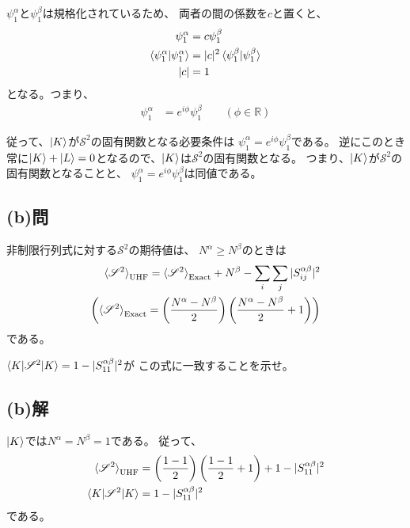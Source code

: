 $\psi_1^{\alpha}$と$\psi_1^{\beta}$は規格化されているため、
両者の間の係数を$c$と置くと、
\begin{align}
	\psi_1^{\alpha}
&=
	c\psi_1^{\beta} \\
%
%
	\braket{\psi_1^{\alpha}|\psi_1^{\alpha}}
&=
	|c|^2 \braket{\psi_1^{\beta}|\psi_1^{\beta}} \\
%
%
	|c|
&=
	1
\end{align}
となる。つまり、
\begin{align}
	\psi_1^{\alpha}
&=
	e^{i\phi} \psi_1^{\beta}
	\qquad
	(\phi\in\mathbb{R})
\end{align}

従って、$\ket{K}$が$\mathscr{S}^2$の固有関数となる必要条件は
$\psi_1^{\alpha}=e^{i\phi} \psi_1^{\beta}$である。
逆にこのとき常に$\ket{K}+\ket{L}=0$となるので、$\ket{K}$は$\mathscr{S}^2$の固有関数となる。
つまり、$\ket{K}$が$\mathscr{S}^2$の固有関数となることと、
$\psi_1^{\alpha}=e^{i\phi} \psi_1^{\beta}$は同値である。


\subsection{(b)問}
非制限行列式に対する$\mathscr{S}^2$の期待値は、
$N^{\alpha}\geq N^{\beta}$のときは
\begin{align}
	\braket{\mathscr{S}^2}_{\rm UHF}
=
	\braket{\mathscr{S}^2}_{\rm Exact}
	+
	N^{\beta}
	-
	\sum_i \sum_j |S_{ij}^{\alpha\beta}|^2 \\
%
	\left(
		\braket{\mathscr{S}^2}_{\rm Exact}
		=
		\left(
			\frac{N^{\alpha}-N^{\beta}}{2}
		\right)
		\left(
			\frac{N^{\alpha}-N^{\beta}}{2}
			+
			1
		\right)
	\right)
\end{align}
である。

$\braket{K|\mathscr{S}^2|K}=1-|S_{11}^{\alpha\beta}|^2$が
この式に一致することを示せ。

\subsection{(b)解}
$\ket{K}$では$N^{\alpha}=N^{\beta}=1$である。
従って、
\begin{align}
	\braket{\mathscr{S}^2}_{\rm UHF}
&=
	\left(
		\frac{1-1}{2}
	\right)
	\left(
		\frac{1-1}{2}
		+
		1
	\right)
	+
	1
	-
	|S_{11}^{\alpha\beta}|^2 \\
%
%
	\braket{K|\mathscr{S}^2|K}
&=
	1
	-
	|S_{11}^{\alpha\beta}|^2
\end{align}
である。



